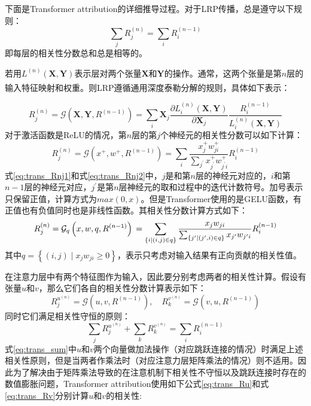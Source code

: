 下面是Transformer attribution的详细推导过程。对于LRP传播，总是遵守以下规则：
\begin{equation}
	\sum_{j} R_{j}^{(n)}=\sum_{i} R_{i}^{(n-1)}
\end{equation}
即每层的相关性分数总和总是相等的。


若用$L^{(n)}(\mathbf{X},\mathbf{Y})$表示层对两个张量$\mathbf{X}$和$\mathbf{Y}$的操作。通常，这两个张量是第$n$层的输入特征映射和权重。则LRP遵循通用深度泰勒分解\textsuperscript{\cite{montavon2017explaining}}的规则，具体如下表示：

\begin{equation}
	R_{j}^{(n)} =\mathcal{G}\left(\mathbf{X}, \mathbf{Y}, R^{(n-1)}\right) =\sum_{i} \mathbf{X}_{j} \frac{\partial L_{i}^{(n)}(\mathbf{X}, \mathbf{Y})}{\partial \mathbf{X}_{j}} \frac{R_{i}^{(n-1)}}{L_{i}^{(n)}(\mathbf{X}, \mathbf{Y})}
	\label{eq:trans_Rnj1}
\end{equation}
对于激活函数是ReLU的情况，第$n$层的第$j$个神经元的相关性分数可以如下计算：
\begin{equation}
	R_{j}^{(n)}=\mathcal{G}\left(x^{+}, w^{+}, R^{(n-1)}\right)=\sum_{i} \frac{x_{j}^{+} w_{j i}^{+}}{\sum_{j^{\prime}} x_{j^{\prime}}^{+} w_{j^{\prime} i}^{+}} R_{i}^{(n-1)}
	\label{eq:trans_Rnj2}
\end{equation}
式\ref{eq:trans_Rnj1}和式\ref{eq:trans_Rnj2}中，$j$是和第$n$层的神经元对应的，$i$和第$n-1$层的神经元对应，$j^{\prime}$是第$n$层神经元的取和过程中的迭代计数符号。加号表示只保留正值，计算方式为$max(0,x)$。但是Transformer使用的是GELU函数，有正值也有负值同时也是非线性函数。其相关性分数计算方式如下：
\begin{equation}
	R_{j}^{(n)}  =\mathcal{G}_{q}\left(x, w, q, R^{(n-1)}\right) \\
	 =\sum_{\{i \mid(i, j) \in q\}} \frac{x_{j} w_{j i}}{\sum_{\{j^{\prime} \mid\left(j^{\prime}, i\right) \in q\}} x_{j^{\prime}} w_{j^{\prime} i}} R_{i}^{(n-1)}
\end{equation}
其中$q=\left\{(i, j) \mid x_{j} w_{j i} \geq 0\right\}$，表示只考虑对输入结果有正向贡献的相关性值。

在注意力层中有两个特征图作为输入，因此要分别考虑两者的相关性计算。假设有张量$u$和$v$，那么它们各自的相关性分数计算表示如下：
\begin{equation}
	R_{j}^{u^{(n)}}=\mathcal{G}\left(u, v, R^{(n-1)}\right), \quad R_{k}^{v^{(n)}}=\mathcal{G}\left(v, u, R^{(n-1)}\right)
\end{equation}
同时它们满足相关性守恒的原则：
\begin{equation}
	\sum_j R_{j}^{u^{(n)}}+ \sum_k R_{k}^{v^{(n)}}=\sum_i R_{i}^{(n-1)}
	\label{eq:trans_sum}
\end{equation}
式\ref{eq:trans_sum}中$u$和$v$两个向量做加法操作（对应跳跃连接的情况）时满足上述相关性原则，但是当两者作乘法时（对应注意力层矩阵乘法的情况）则不适用。因此为了解决由于矩阵乘法导致的在注意机制下相关性不守恒以及跳跃连接时存在的数值膨胀问题，Transformer attribution使用如下公式\ref{eq:trans_Ru}和式\ref{eq:trans_Rv}分别计算$u$和$v$的相关性:

